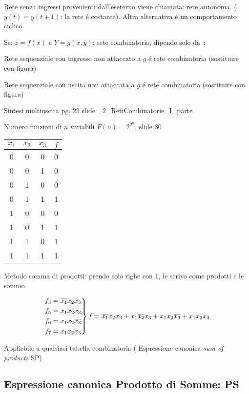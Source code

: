 \documentclass{article}
\begin{document}
Rete senza ingressi provenienti dall'eseterno viene chiamata: rete autonoma.  ($y(t) = y(t+1)$: la rete \'e costante).
Altra alternativa \'e un comportamento ciclico.

Se:
$z = f(x)$ e $Y= g(x, y)$: rete combinatoria, dipende solo da $z$


Rete sequenziale con ingresso non attaccato a $g$ \'e rete combinatoria (sostituire con figura)

Rete sequenziale con uscita non attaccata a $g$ \'e rete combinatoria (sostituire con figura)

Sintesi multiuscita pg. 29 slide \_2\_RetiCombinatorie\_I\_parte

Numero funzioni di $n$ variabili $F(n) = 2^{2^n}$, slide 30

\begin{center}
    \begin{tabular}{c c c|c}
        $x_1$ & $x_2$ & $x_3$ & $f$\\
        \hline{}
        0 & 0 & 0 & 0\\
        0 & 0 & 1 & 0\\
        0 & 1 & 0 & 0\\
        0 & 1 & 1 & 1\\
        \hline{}
        1 & 0 & 0 & 0\\
        1 & 0 & 1 & 1\\
        1 & 1 & 0 & 1\\
        1 & 1 & 1 & 1\\
    \end{tabular}
\end{center}

Metodo somma di prodotti: prendo solo righe con 1, le scrivo come prodotti e le sommo

\[
    \begin{rcases}
        f_3 = \overline{x_1} x_2 x_3\\
        f_5 = x_1 \overline{x_2} x_3\\
        f_6 = x_1 x_2 \overline{x_3}\\
        f_7 = x_1 x_2 x_3
    \end{rcases}
    f =  \overline{x_1} x_2 x_3 + x_1 \overline{x_2} x_3 +  x_1 x_2 \overline{x_3} + x_1 x_2 x_3
\]

Applicbile a qualsiasi tabella combinatoria ( Espressione canonica \textit{sum of products} SP)


\subsection{Espressione canonica Prodotto di Somme: PS}
\end{document}
